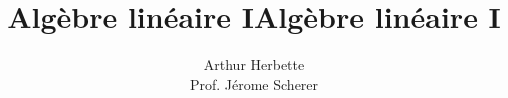 \documentclass[11pt]{book}
\title{Algèbre linéaire I}
\author{Arthur Herbette \\
Prof. Jérome Scherer}
\begin{document}
\setcounter{section}{8}
\title{Algèbre linéaire I}
\maketitle
\thispagestyle{empty}
\listoflectures

























\end{document}
